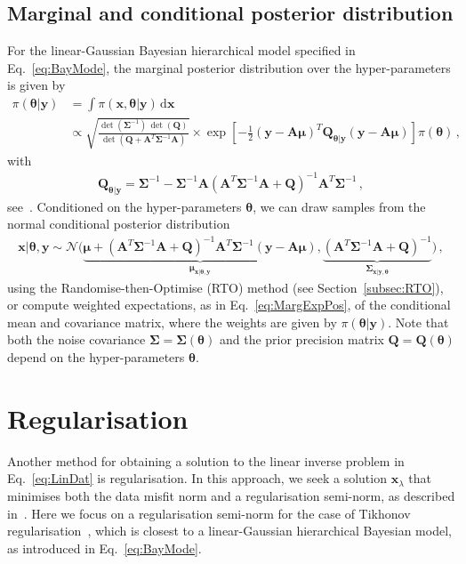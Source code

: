 \subsection{Marginal and conditional posterior distribution}
\label{subsec:MTC}
For the linear-Gaussian Bayesian hierarchical model specified in Eq.~\ref{eq:BayMode}, the marginal posterior distribution over the hyper-parameters is given by
\begin{align}
	\pi(\bm{\theta} |  \bm{y}) &= \int \pi(\bm{x}, \bm{\theta} | \bm{y}) \, \mathrm{d} \bm{x} \\ 
	\label{eq:condHyper}
	&\propto \sqrt{ \frac{ \det( \bm{\Sigma}^{-1} ) \,  \det( \bm{Q} ) }{\det( \bm{Q} + \bm{A}^T \bm{\Sigma}^{-1} \bm{A} ) } } \times \exp \left[ - \frac{1}{2}(\bm{y} - \bm{A} \bm{\mu})^T \bm{Q}_{\bm{\theta |  y}} (\bm{y} - \bm{A} \bm{\mu}) \right] \pi(\bm{\theta}) \, ,
\end{align}
with
\begin{align}
	\bm{Q}_{\bm{\theta |  y}} = \bm{\Sigma}^{-1} - \bm{\Sigma}^{-1} \bm{A} \left( \bm{A}^T \bm{\Sigma}^{-1} \bm{A} + \bm{Q} \right)^{-1} \bm{A}^T \bm{\Sigma}^{-1} \, ,
\end{align}
see~\cite[Lemma 2]{fox2016fast}. 
Conditioned on the hyper-parameters $\bm{\theta}$, we can draw samples from the normal conditional posterior distribution
\begin{align}
	\bm{x} |  \bm{\theta}, \bm{y} \sim \mathcal{N} \Big(
	\underbrace{\bm{\mu} + \left( \bm{A}^T \bm{\Sigma}^{-1} \bm{A} + \bm{Q} \right)^{-1} \bm{A}^T \bm{\Sigma}^{-1} (\bm{y} - \bm{A} \bm{\mu})}_{\bm{\mu}_{\bm{x} |  \bm{\theta}, \bm{y}}},
	\underbrace{ \left( \bm{A}^T \bm{\Sigma}^{-1} \bm{A} + \bm{Q} \right)^{-1} }_{\bm{\Sigma}_{\bm{x} |  \bm{y}, \bm{\theta}}}
	\Big) \, ,
\end{align}
using the Randomise-then-Optimise (RTO) method (see Section~\ref{subsec:RTO}), or compute weighted expectations, as in Eq.~\ref{eq:MargExpPos}, of the conditional mean and covariance matrix, where the weights are given by $\pi(\bm{\theta} | \bm{y})$. 
Note that both the noise covariance $\bm{\Sigma} = \bm{\Sigma}(\bm{\theta})$ and the prior precision matrix $\bm{Q} = \bm{Q}(\bm{\theta})$ depend on the hyper-parameters $\bm{\theta}$.

\section{Regularisation}
\label{sec:regularise}
Another method for obtaining a solution to the linear inverse problem in Eq.~\ref{eq:LinDat} is regularisation. In this approach, we seek a solution $\bm{x}_{\lambda}$ that minimises both the data misfit norm and a regularisation semi-norm, as described in~\cite{fox2016fast}. Here we focus on a regularisation semi-norm for the case of Tikhonov regularisation~\cite{kaipio2005statinv, tan2016LecNot}, which is closest to a linear-Gaussian hierarchical Bayesian model, as introduced in Eq.~\ref{eq:BayMode}.

